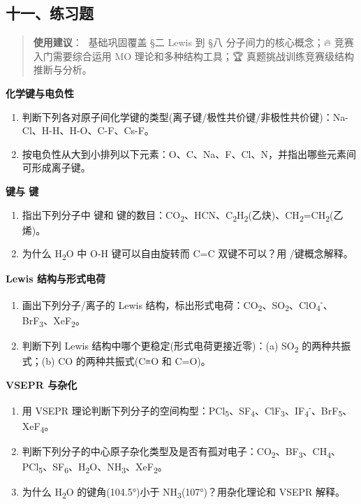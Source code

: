 \subsection{十一、练习题}\label{ux5341ux4e00ux7ec3ux4e60ux9898}

\begin{quote}
\textbf{使用建议}：🌱 基础巩固覆盖 §二 Lewis 到 §八 分子间力的核心概念；🔥 竞赛入门需要综合运用 MO 理论和多种结构工具；🏆 真题挑战训练竞赛级结构推断与分析。
\end{quote}

\textbf{化学键与电负性}

\begin{enumerate}
\def\labelenumi{\arabic{enumi}.}
\item
  判断下列各对原子间化学键的类型(离子键/极性共价键/非极性共价键)：Na-Cl、H-H、H-O、C-F、Cs-F。
\item
  按电负性从大到小排列以下元素：O、C、Na、F、Cl、N，并指出哪些元素间可形成离子键。
\end{enumerate}

\textbf{ 键与 \派 键}

\begin{enumerate}
\def\labelenumi{\arabic{enumi}.}
\setcounter{enumi}{2}
\item
  指出下列分子中  键和 \派 键的数目：CO\textsubscript{2}、HCN、C\textsubscript{2}H\textsubscript{2}(乙炔)、CH\textsubscript{2}=CH\textsubscript{2}(乙烯)。
\item
  为什么 H\textsubscript{2}O 中 O-H 键可以自由旋转而 C=C 双键不可以？用 /\派 键概念解释。
\end{enumerate}

\textbf{Lewis 结构与形式电荷}

\begin{enumerate}
\def\labelenumi{\arabic{enumi}.}
\setcounter{enumi}{4}
\item
  画出下列分子/离子的 Lewis 结构，标出形式电荷：CO\textsubscript{2}、SO\textsubscript{2}、ClO\textsubscript{4}\textsuperscript{-}、BrF\textsubscript{3}、XeF\textsubscript{2}。
\item
  判断下列 Lewis 结构中哪个更稳定(形式电荷更接近零)：(a) SO\textsubscript{2} 的两种共振式；(b) CO 的两种共振式(C≡O 和 C=O)。
\end{enumerate}

\textbf{VSEPR 与杂化}

\begin{enumerate}
\def\labelenumi{\arabic{enumi}.}
\setcounter{enumi}{6}
\item
  用 VSEPR 理论判断下列分子的空间构型：PCl\textsubscript{5}、SF\textsubscript{4}、ClF\textsubscript{3}、IF\textsubscript{4}\textsuperscript{-}、BrF\textsubscript{5}、XeF\textsubscript{4}。
\item
  判断下列分子的中心原子杂化类型及是否有孤对电子：CO\textsubscript{2}、BF\textsubscript{3}、CH\textsubscript{4}、PCl\textsubscript{5}、SF\textsubscript{6}、H\textsubscript{2}O、NH\textsubscript{3}、XeF\textsubscript{2}。
\item
  为什么 H\textsubscript{2}O 的键角(104.5°)小于 NH\textsubscript{3}(107°)？用杂化理论和 VSEPR 解释。
\end{enumerate}


